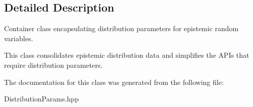 \subsection{Detailed Description}
Container class encapsulating distribution parameters for epistemic random variables. 

This class consolidates epistemic distribution data and simplifies the A\+P\+Is that require distribution parameters. 

The documentation for this class was generated from the following file\+:\begin{DoxyCompactItemize}
\item 
Distribution\+Params.\+hpp\end{DoxyCompactItemize}
